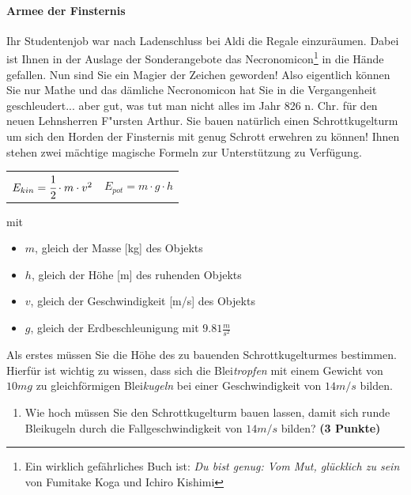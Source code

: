 \documentclass[a4paper, 9pt]{scrartcl}\usepackage[]{graphicx}\usepackage[]{xcolor}
\begin{document}
\paragraph{Armee der Finsternis}



Ihr Studentenjob war nach Ladenschluss bei Aldi die Regale
einzur{\"a}umen. Dabei ist Ihnen in der Auslage der Sonderangebote das
Necronomicon\footnote{Ein wirklich gef{\"a}hrliches Buch ist:
  \textit{Du bist genug: Vom Mut, gl{\"u}cklich zu sein} von Fumitake Koga und
  Ichiro Kishimi} in die H{\"a}nde gefallen. Nun sind Sie ein Magier der
Zeichen geworden! Also eigentlich k{\"o}nnen Sie nur Mathe und das d{\"a}mliche
Necronomicon hat Sie in die Vergangenheit geschleudert... aber gut, was tut
man nicht alles im Jahr 826 n. Chr. f{\"u}r den neuen Lehnsherren
F{"u}rsten Arthur. Sie bauen nat{\"u}rlich einen Schrottkugelturm um sich den
Horden der Finsternis mit genug Schrott erwehren zu k{\"o}nnen! Ihnen stehen
zwei m{\"a}chtige magische Formeln zur Unterst{\"u}tzung zu Verf{\"u}gung.

\begin{center}
  \begin{tabular}{cc}
    $E_{kin} = \cfrac{1}{2}\cdot m \cdot v^2$ & $E_{pot} = m \cdot g \cdot h$\\
  \end{tabular}
\end{center}

mit

\begin{itemize}
\item $m$, gleich der Masse [kg] des Objekts
\item $h$, gleich der H{\"o}he [m] des ruhenden Objekts
\item $v$, gleich der Geschwindigkeit [m/s] des Objekts
\item $g$, gleich der Erdbeschleunigung mit $9.81 \tfrac{m}{s^2}$ 
\end{itemize}

Als erstes m{\"u}ssen Sie die H{\"o}he des zu bauenden Schrottkugelturmes
bestimmen. Hierf{\"u}r ist wichtig zu wissen, dass sich die
Blei\textit{tropfen} mit einem Gewicht von $10mg$ zu
gleichf{\"o}rmigen Blei\textit{kugeln} bei einer Geschwindigkeit von
$14m/s$ bilden.

\begin{enumerate}
\item Wie hoch m{\"u}ssen Sie den Schrottkugelturm bauen lassen, damit sich
  runde Bleikugeln durch die Fallgeschwindigkeit von $14m/s$ bilden?
  \textbf{(3 Punkte)}
\end{enumerate}
\end{document}
